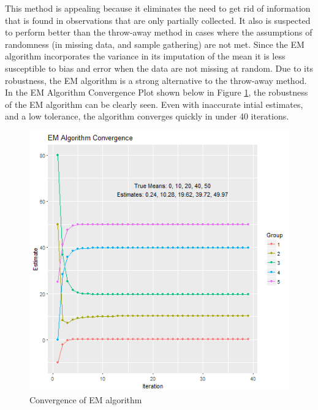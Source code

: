 \documentclass{svproc}
\begin{document}
This method is appealing because it eliminates the need to get rid of information that is found in observations that are only partially collected. It also is suspected to perform better than the throw-away method in cases where the assumptions of randomness (in missing data, and sample gathering) are not met. Since the EM algorithm incorporates the variance in its imputation of the mean it is less susceptible to bias and error when the data are not missing at random. Due to its robustness, the EM algorithm is a strong alternative to the throw-away method. In the EM Algorithm Convergence Plot shown below in Figure \ref{convfig}, the robustness of the EM algorithm can be clearly seen. Even with inaccurate intial estimates, and a low tolerance, the algorithm converges quickly in under 40 iterations.

\begin{figure}

\begin{center}
\includegraphics[width=0.65\linewidth]{EMconvergence-wonky}
\end{center}
\caption{Convergence of EM algorithm}
\label{convfig}
\end{figure}
\end{document}
